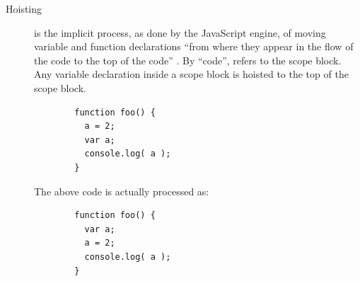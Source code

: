\begin{description}
\item[Hoisting]
is the implicit process, as done by the JavaScript engine, of moving
variable and function declarations “from where they appear in the flow
of the code to the top of the code” \cite{getify}. By “code”,
 refers to the scope block. Any variable declaration
inside a scope block is hoisted to the top of the scope block.

\begin{verbatim}
        function foo() {
          a = 2;
          var a;
          console.log( a );
        }
\end{verbatim}

The above code is actually processed as:

\begin{verbatim}
        function foo() {
          var a;
          a = 2;
          console.log( a );
        }
\end{verbatim}


\end{description}
